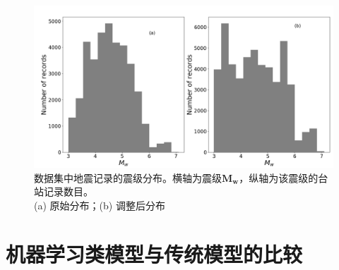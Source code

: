 \begin{figure}[!h]%
	\centering  %
	\includegraphics[width=\linewidth]{img/event_dist.png}  %
	\caption{数据集中地震记录的震级分布。横轴为震级$\mathbf{M}_{\mathbf{w}}$，纵轴为该震级的台站记录数目。\\
(a) 原始分布；(b) 调整后分布}  %
	\label{fig:mcmthesis-logo}   %
\end{figure}
\section{机器学习类模型与传统模型的比较}

